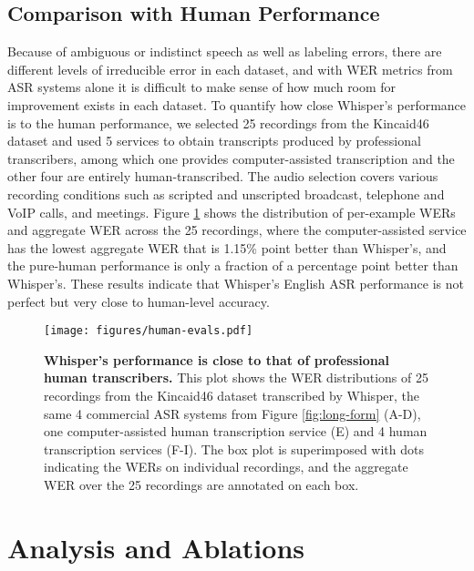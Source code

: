 \subsection{Comparison with Human Performance}\label{subsec:human-comparison}

Because of ambiguous or indistinct speech as well as labeling errors, there are different levels of irreducible error in each dataset, and with WER metrics from ASR systems alone it is difficult to make sense of how much room for improvement exists in each dataset. To quantify how close Whisper's performance is to the human performance, we selected 25 recordings from the Kincaid46 dataset and used 5 services to obtain transcripts produced by professional transcribers, among which one provides computer-assisted transcription and the other four are entirely human-transcribed. The audio selection covers various recording conditions such as scripted and unscripted broadcast, telephone and VoIP calls, and meetings. Figure \ref{fig:human-evals} shows the distribution of per-example WERs and aggregate WER across the 25 recordings, where the computer-assisted service has the lowest aggregate WER that is 1.15\% point better than Whisper's, and the pure-human performance is only a fraction of a percentage point better than Whisper's. These results indicate that Whisper's English ASR performance is not perfect but very close to human-level accuracy.

\begin{figure}[t]
\begin{center}
\centerline{\texttt{[image: figures/human-evals.pdf]}}
\caption{\textbf{Whisper's performance is close to that of professional human transcribers.} This plot shows the WER distributions of 25 recordings from the Kincaid46 dataset transcribed by Whisper, the same 4 commercial ASR systems from Figure \ref{fig:long-form} (A-D), one computer-assisted human transcription service (E) and 4 human transcription services (F-I). The box plot is superimposed with dots indicating the WERs on individual recordings, and the aggregate WER over the 25 recordings are annotated on each box.}
\label{fig:human-evals}
\end{center}
\vspace{-1em}
\end{figure}

\section{Analysis and Ablations}\label{sec:ablation}

